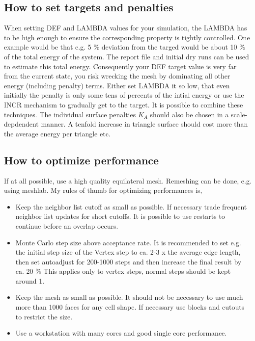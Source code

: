 \documentclass[11pt]{article}
\begin{document}
\subsection{How to set targets and penalties}

When setting DEF and LAMBDA values for your simulation, the LAMBDA has to be high enough to ensure the corresponding property is tightly controlled. One example would be that e.g. 5 \% deviation from the targed would be about 10 \% of the total energy of the system. The report file and initial dry runs can be used to estimate this total energy.
Consequently your DEF target value is very far from the current state, you risk wrecking the mesh by dominating all other energy (including penalty) terms. Either set LAMBDA it so low, that even initially the penalty is only some tens of percents of the intial energy or use the INCR mechanism to gradually get to the target. It is possible to combine these techniques. The individual surface penalties $K_A$ should also be chosen in a scale-depdendent manner. A tenfold increase in triangle surface should cost more than the average energy per triangle etc.

\subsection{How to optimize performance}

If at all possible, use a high quality equilateral mesh. Remeshing can be done, e.g. using meshlab.
My rules of thumb for optimizing performances is,
\begin{itemize}
    \item Keep the neighbor list cutoff as small as possible. If necessary trade frequent neighbor list updates for short cutoffs. It is possible to use restarts to continue before an overlap occurs.
    \item Monte Carlo step size above acceptance rate. It is recommended to set e.g. the initial step size of the Vertex step to ca. 2-3 x the average edge length, then set autoadjust for 200-1000 steps and then increase the final result by ca. 20 \%
    This applies only to vertex steps, normal steps should be kept around 1.
    \item Keep the mesh as small as possible. It should not be necessary to use much more than 1000 faces for any cell shape. If necessary use blocks and cutouts to restrict the size.
    \item Use a workstation with many cores and good single core performance.
\end{itemize}
\end{document}
